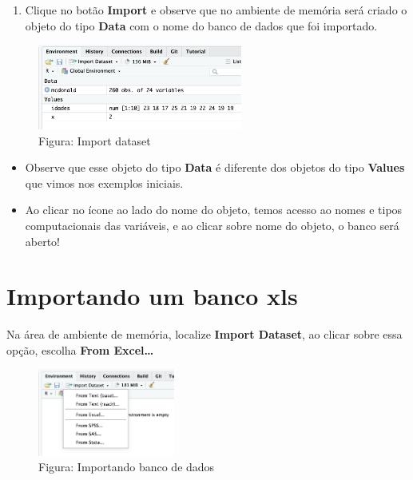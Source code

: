 \documentclass[
]{book}
\providecommand{\tightlist}{%
  \setlength{\itemsep}{0pt}\setlength{\parskip}{0pt}}
\begin{document}
\begin{enumerate}
\def\labelenumi{\arabic{enumi}.}
\setcounter{enumi}{3}
\tightlist
\item
  Clique no botão \textbf{Import} e observe que no ambiente de memória será criado o objeto do tipo \textbf{Data} com o nome do banco de dados que foi importado.
\end{enumerate}

\begin{figure}
\centering
\includegraphics[width=0.6\textwidth,height=\textheight]{telaImportObjetoData.png}
\caption{ Figura: Import dataset}
\end{figure}

\begin{itemize}
\item
  Observe que esse objeto do tipo \textbf{Data} é diferente dos objetos do tipo \textbf{Values} que vimos nos exemplos iniciais.
\item
  Ao clicar no ícone ao lado do nome do objeto, temos acesso ao nomes e tipos computacionais das variáveis, e ao clicar sobre nome do objeto, o banco será aberto!
\end{itemize}

\section{Importando um banco xls}\label{importando-um-banco-xls}

Na área de ambiente de memória, localize \textbf{Import Dataset}, ao clicar sobre essa opção, escolha \textbf{From Excel\ldots{}}

\begin{figure}
\centering
\includegraphics[width=0.4\textwidth,height=\textheight]{telaImportDataset.png}
\caption{ Figura: Importando banco de dados}
\end{figure}
\end{document}
